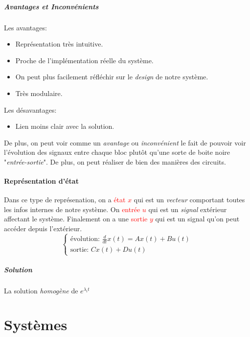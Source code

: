 \documentclass{report}
\begin{document}
\subsubsection{Avantages et Inconvénients}
Les avantages:
\begin{itemize}
	\item Représentation très intuitive.
	\item Proche de l'implémentation réelle du système.
	\item On peut plus facilement réfléchir sur le \textit{design} de notre système.
	\item Très modulaire.
\end{itemize}
Les désavantages:
\begin{itemize}
	\item Lien moins clair avec la solution.
\end{itemize}
De plus, on peut voir comme un \textit{avantage} ou \textit{inconvénient} le fait de pouvoir voir l'évolution des signaux entre chaque bloc plutôt qu'une sorte de boite noire "\textit{entrée-sortie}". De plus, on peut réaliser de bien des manières des circuits.

\subsection{Représentation d'état}
Dans ce type de représenation, on a \textcolor{red}{état $x$} qui est un \textit{vecteur} comportant toutes les infos internes de notre système. On \textcolor{red}{entrée $u$} qui est un \textit{signal} extérieur affectant le système. Finalement on a une \textcolor{red}{sortie $y$} qui est un signal qu'on peut accéder depuis l'extérieur.\\
\begin{equation}
\begin{cases}
\text{évolution: }\frac{d}{dt}x(t) =  Ax(t) + Bu(t)\\
\text{sortie: } C x(t) + D u(t)
\end{cases}
\end{equation}

\subsubsection{Solution}
La solution \textit{homogène} de $e^{\lambda_it}$



\part{Systèmes}
\end{document}
